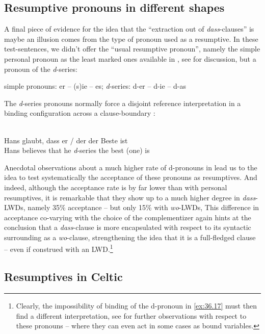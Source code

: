 \documentclass[output=paper]{langsci/langscibook}
\begin{document}
\subsection{Resumptive pronouns in different shapes}\label{sub:36.3.4} %

A final piece of evidence for the idea that the \enquote{extraction out of
    \emph{dass}-clauses} is maybe an illusion comes from the type of pronoun
    used as a resumptive. In these test-sentences, we didn’t offer the
    \enquote{usual resumptive pronoun}, namely the simple personal pronoun as
    the least marked ones available in , see \citet{Adger2011}
    for discussion, but a pronoun of the \emph{d}-series:

\ea
    simple pronouns: er -- (s)ie -- es; \emph{d}-series: d-er -- d-ie -- d-as
\z

The \emph{d}-series pronouns normally force a disjoint reference interpretation in a
binding configuration across a clause-boundary \parencite{Wiltschko1998}:

\ea\label{ex:36.17} \\
    \gll Hans glaubt, dass er / der der Beste ist\\
    Hans believes that he {} \emph{d}-series the best (one) is\\
\z

Anecdotal observations about a much higher rate of d-pronouns in  lead
us to the idea to test systematically the acceptance of these pronouns as
resumptives. And indeed, although the acceptance rate is by far lower than with
personal resumptives, it is remarkable that they show up to a much higher
degree in \emph{dass}-\glspl{LWD}, namely 35\% acceptance -- but only 15\%
with \emph{wo}-\gls{LWD}s,  This difference in acceptance co-varying with the
choice of the complementizer again hints at the conclusion that a
\emph{dass}-clause is more encapsulated with respect to its syntactic
surrounding as a \emph{wo}-clause, strengthening the idea that it is a
full-fledged clause -- even if construed with an \gls{LWD}.\footnote{Clearly,
    the impossibility of binding of the d-pronoun in \eqref{ex:36.17} must
then find a different interpretation, see \citet{vanKampen2012} for further
observations with respect to these pronouns -- where they can even act in some
cases as bound variables.}

\subsection{Resumptives in Celtic}\label{sub:36.3.5} %
\end{document}
